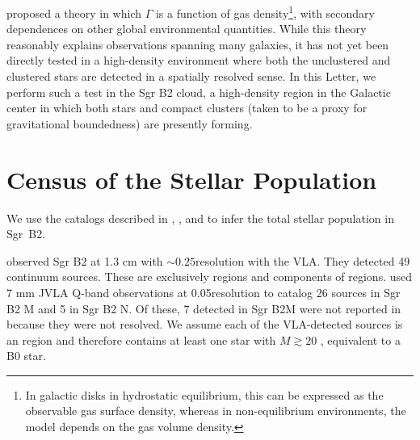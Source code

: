 \documentclass[twocolumn]{aastex62}
\begin{document}
\citet{Kruijssen2012a} proposed a theory in which $\Gamma$ is a function of gas
density\footnote{In galactic disks in hydrostatic equilibrium, this can be expressed as the observable gas surface density, whereas in non-equilibrium environments, the model depends on the gas volume density.}, with secondary dependences on other global environmental quantities.  While this theory reasonably explains observations spanning many galaxies, it has not yet been directly tested in a
high-density environment where both the unclustered and clustered stars are
detected in a spatially resolved sense.  In this Letter, we perform such a test in the Sgr B2 cloud, a
high-density region in the Galactic center in which both stars and compact clusters (taken to be a proxy for gravitational boundedness) are presently forming.


\section{Census of the Stellar Population}

We use the catalogs described in \citet{Ginsburg2018a}, \citet{Gaume1995a}, and
\citet{De-Pree2015a} to infer the total stellar population in Sgr~B2.

\citet{Gaume1995a} observed Sgr B2 at 1.3 cm with $\sim0.25$\arcsec resolution
with the VLA.  They detected 49 continuum sources.  These are exclusively \hii
regions and components of \hii regions.  \citet{De-Pree2015a} used 7 mm JVLA
Q-band observations at 0.05\arcsec resolution to catalog 26 sources in Sgr B2 M
and 5 in Sgr B2 N.  Of these, 7 detected in Sgr B2M were not reported in
\citet{Gaume1995a} because they were not resolved.  We assume each of the
VLA-detected sources is an \hii region and therefore contains at least one star
with $M\gtrsim20$ \msun, equivalent to a B0 star.
\end{document}
